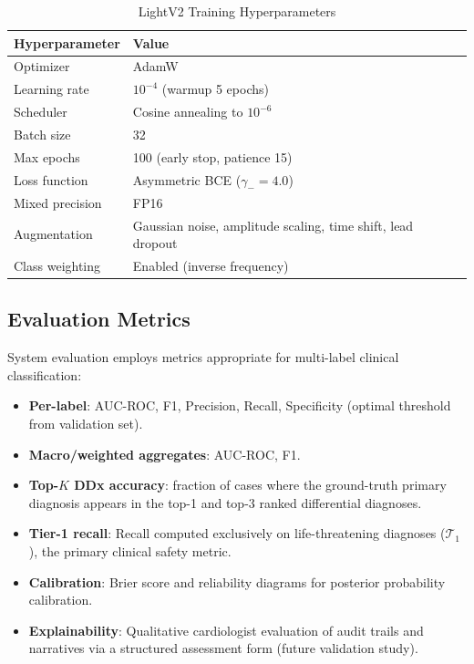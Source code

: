 \documentclass[journal]{IEEEtran}
\begin{document}
\begin{table}[!t]
\centering
\caption{LightV2 Training Hyperparameters}
\label{tab:train_config}
\begin{tabular}{@{}ll@{}}
  \toprule
  Hyperparameter & Value \\
  \midrule
  Optimizer           & AdamW \\
  Learning rate       & $10^{-4}$ (warmup 5 epochs) \\
  Scheduler           & Cosine annealing to $10^{-6}$ \\
  Batch size          & 32 \\
  Max epochs          & 100 (early stop, patience 15) \\
  Loss function       & Asymmetric BCE ($\gamma_-{=}4.0$) \\
  Mixed precision     & FP16 \\
  Augmentation        & Gaussian noise, amplitude scaling,
                        time shift, lead dropout \\
  Class weighting     & Enabled (inverse frequency) \\
  \bottomrule
\end{tabular}
\end{table}

\subsection{Evaluation Metrics}

System evaluation employs metrics appropriate for multi-label
clinical classification:

\begin{itemize}
  \item \textbf{Per-label}: AUC-ROC, F1, Precision, Recall,
        Specificity (optimal threshold from validation set).
  \item \textbf{Macro/weighted aggregates}: AUC-ROC, F1.
  \item \textbf{Top-$K$ DDx accuracy}: fraction of cases where
        the ground-truth primary diagnosis appears in the top-1
        and top-3 ranked differential diagnoses.
  \item \textbf{Tier-1 recall}: Recall computed exclusively on
        life-threatening diagnoses ($\mathcal{T}_1$), the
        primary clinical safety metric.
  \item \textbf{Calibration}: Brier score and reliability
        diagrams for posterior probability calibration.
  \item \textbf{Explainability}: Qualitative cardiologist evaluation
        of audit trails and narratives via a structured assessment
        form (future validation study).
\end{itemize}
\end{document}
